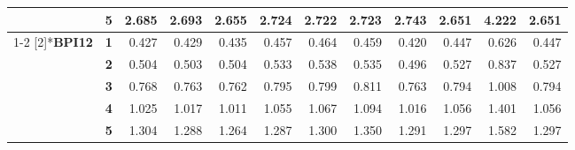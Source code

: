 \begin{table}[htbp]
\begin{tabular}{|cl|rrrrrrrrrr|}
          & \textbf{5} & \cellcolor[rgb]{ .8,  .8,  .8}2.685 & \cellcolor[rgb]{ .796,  .796,  .796}2.693 & \cellcolor[rgb]{ .8,  .8,  .8}2.655 & \cellcolor[rgb]{ .796,  .796,  .796}2.724 & \cellcolor[rgb]{ .796,  .796,  .796}2.722 & \cellcolor[rgb]{ .796,  .796,  .796}2.723 & \cellcolor[rgb]{ .792,  .792,  .792}2.743 & \cellcolor[rgb]{ .8,  .8,  .8}2.651 & \cellcolor[rgb]{ .651,  .651,  .651}4.222 & \cellcolor[rgb]{ .8,  .8,  .8}2.651 \\
\cmidrule{1-2}    \multirow{5}[2]{*}{\textbf{BPI12}} & \textbf{1} & \cellcolor[rgb]{ .851,  .851,  .851}0.427 & \cellcolor[rgb]{ .851,  .851,  .851}0.429 & \cellcolor[rgb]{ .851,  .851,  .851}0.435 & \cellcolor[rgb]{ .847,  .847,  .847}0.457 & \cellcolor[rgb]{ .847,  .847,  .847}0.464 & \cellcolor[rgb]{ .847,  .847,  .847}0.459 & \cellcolor[rgb]{ .851,  .851,  .851}0.420 & \cellcolor[rgb]{ .847,  .847,  .847}0.447 & \cellcolor[rgb]{ .816,  .816,  .816}0.626 & \cellcolor[rgb]{ .847,  .847,  .847}0.447 \\
          & \textbf{2} & \cellcolor[rgb]{ .839,  .839,  .839}0.504 & \cellcolor[rgb]{ .839,  .839,  .839}0.503 & \cellcolor[rgb]{ .839,  .839,  .839}0.504 & \cellcolor[rgb]{ .835,  .835,  .835}0.533 & \cellcolor[rgb]{ .831,  .831,  .831}0.538 & \cellcolor[rgb]{ .831,  .831,  .831}0.535 & \cellcolor[rgb]{ .839,  .839,  .839}0.496 & \cellcolor[rgb]{ .835,  .835,  .835}0.527 & \cellcolor[rgb]{ .78,  .78,  .78}0.837 & \cellcolor[rgb]{ .835,  .835,  .835}0.527 \\
          & \textbf{3} & \cellcolor[rgb]{ .792,  .792,  .792}0.768 & \cellcolor[rgb]{ .792,  .792,  .792}0.763 & \cellcolor[rgb]{ .792,  .792,  .792}0.762 & \cellcolor[rgb]{ .788,  .788,  .788}0.795 & \cellcolor[rgb]{ .788,  .788,  .788}0.799 & \cellcolor[rgb]{ .784,  .784,  .784}0.811 & \cellcolor[rgb]{ .792,  .792,  .792}0.763 & \cellcolor[rgb]{ .788,  .788,  .788}0.794 & \cellcolor[rgb]{ .753,  .753,  .753}1.008 & \cellcolor[rgb]{ .788,  .788,  .788}0.794 \\
          & \textbf{4} & \cellcolor[rgb]{ .749,  .749,  .749}1.025 & \cellcolor[rgb]{ .749,  .749,  .749}1.017 & \cellcolor[rgb]{ .753,  .753,  .753}1.011 & \cellcolor[rgb]{ .745,  .745,  .745}1.055 & \cellcolor[rgb]{ .741,  .741,  .741}1.067 & \cellcolor[rgb]{ .737,  .737,  .737}1.094 & \cellcolor[rgb]{ .749,  .749,  .749}1.016 & \cellcolor[rgb]{ .745,  .745,  .745}1.056 & \cellcolor[rgb]{ .682,  .682,  .682}1.401 & \cellcolor[rgb]{ .745,  .745,  .745}1.056 \\
          & \textbf{5} & \cellcolor[rgb]{ .702,  .702,  .702}1.304 & \cellcolor[rgb]{ .702,  .702,  .702}1.288 & \cellcolor[rgb]{ .706,  .706,  .706}1.264 & \cellcolor[rgb]{ .702,  .702,  .702}1.287 & \cellcolor[rgb]{ .702,  .702,  .702}1.300 & \cellcolor[rgb]{ .694,  .694,  .694}1.350 & \cellcolor[rgb]{ .702,  .702,  .702}1.291 & \cellcolor[rgb]{ .702,  .702,  .702}1.297 & \cellcolor[rgb]{ .651,  .651,  .651}1.582 & \cellcolor[rgb]{ .702,  .702,  .702}1.297 \\

\end{tabular}
\end{table}
